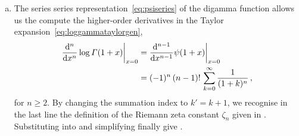 \begin{enumerate}[a)]
\smallskip

\item 
The series series representation~\eqref{eq:psiseries} of the digamma function allows us the compute the higher-order derivatives in the Taylor expansion~\eqref{eq:loggammataylorgen},
\begin{align} \label{eq:dndloggamma}
\begin{aligned}
\frac{\d^n}{\d x^n} \log \Gamma(1+x) \biggl|_{x=0}  & = \frac{\d^{n-1}}{\d x^{n-1}} \psi(1+x) \biggl|_{x=0} \\
& = (-1)^n \, (n-1)! \, \sum_{k=0}^{\infty} \frac{1}{(1+k)^{n}} \,,
\end{aligned}
\end{align}
for $n\ge 2$.
By changing the summation index to $k'=k+1$, we recognise in the last line the definition of the Riemann zeta constant $\zeta_n$ given in . Substituting  into  and simplifying finally give .

\end{enumerate}




